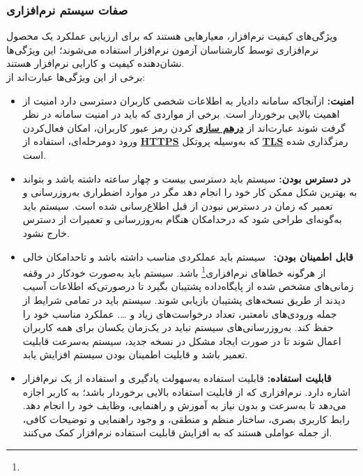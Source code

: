 \documentclass[12pt,a4paper,oneside]{article}
\begin{document}
			\subsubsection{صفات سیستم نرم‌افزاری}

			ویژگی‌های کیفیت نرم‌افزار، معیارهایی هستند که برای 
			ارزیابی عملکرد یک محصول نرم‌افزاری توسط کارشناسان 
			آزمون نرم‌افزار استفاده می‌شوند؛ این ویژگی‌ها نشان‌دهنده 
			کیفیت و کارایی نرم‌افزار هستند.
			\\
			برخی از این ویژگی‌ها عبارت‌اند از:
			
			\begin{itemize}
				\item 
				\textbf{امنیت:}
				ازآنجاکه سامانه دادیار به اطلاعات شخصی کاربران دسترسی دارد امنیت از اهمیت بالایی برخوردار است. برخی از مواردی که باید در امنیت سامانه در نظر گرفت شوند عبارت‌اند از 
				\hyperref[ref:hash]{\textbf{درهم سازی}}
				 کردن رمز عبور کاربران، امکان فعال‌کردن ورود دومرحله‌ای، استفاده از 
				 \hyperref[ref:https]{\textbf{HTTPS}}
				  که به‌وسیله پروتکل 
				  \hyperref[ref:tls]{\textbf{TLS}}
				   رمزگذاری شده است.
				
				\item 
				\textbf{در دسترس بودن:}
				سیستم باید دسترسی بیست و چهار ساعته داشته باشد و بتواند به بهترین شکل ممکن کار خود را انجام دهد مگر در موارد اضطراری به‌روزرسانی و تعمیر که زمان در دسترس نبودن از قبل اطلاع‌رسانی شده است. سیستم باید به‌گونه‌ای طراحی شود که درحدامکان هنگام به‌روزرسانی و تعمیرات از دسترس خارج نشود.
				
				\item 
				\textbf{قابل اطمینان بودن:}
				 سیستم باید عملکردی مناسب داشته باشد و تاحدامکان خالی از هرگونه خطاهای نرم‌افزاری\footnote{} باشد. سیستم باید به‌صورت خودکار در وقفه زمانی‌های مشخص شده از پایگاه‌داده پشتیبان بگیرد تا درصورتی‌که اطلاعات آسیب دیدند از طریق نسخه‌های پشتیبان بازیابی شوند. سیستم باید در تمامی شرایط از جمله ورودی‌های نامعتبر، تعداد درخواست‌های زیاد و …. عملکرد مناسب خود را حفظ کند. به‌روزرسانی‌های سیستم نباید در یک‌زمان یکسان برای همه کاربران اعمال شوند تا در صورت ایجاد مشکل در نسخه جدید، سیستم به‌سرعت قابلیت تعمیر باشد و قابلیت اطمینان بودن سیستم افزایش یابد.
				
				\item 
				\textbf{قابلیت استفاده:}
				قابلیت استفاده به‌سهولت یادگیری و استفاده از یک نرم‌افزار اشاره دارد. نرم‌افزاری که از قابلیت استفاده بالایی برخوردار باشد؛ به کاربر اجازه می‌دهد تا به‌سرعت و بدون نیاز به آموزش و راهنمایی، وظایف خود را انجام دهد. رابط کاربری بصری، ساختار منظم و منطقی، و وجود راهنمایی و توضیحات کافی، از جمله عواملی هستند که به افزایش قابلیت استفاده نرم‌افزار کمک می‌کنند.
				

\end{itemize}
\end{document}
